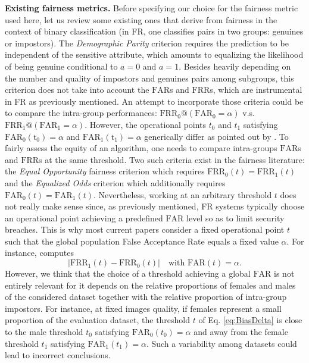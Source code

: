 \documentclass[nohyperref]{article}
\theoremstyle{plain}
\theoremstyle{definition}
\theoremstyle{remark}
\begin{document}
{\bf Existing fairness metrics.} Before specifying our choice for the fairness metric used here, let us review some existing ones \cite{survey_fairness_ML} that derive from fairness in the context of binary classification (in FR, one classifies pairs in two groups: genuines or impostors). 
The {\it Demographic Parity} criterion requires the prediction to be independent of the sensitive attribute, which amounts to equalizing the likelihood of being genuine conditional to $a=0$ and $a=1$. Besides heavily depending on the number and quality of impostors and genuines pairs among subgroups, this criterion does not take into account the $\mathrm{FAR}$s and $\mathrm{FRR}$s, which are instrumental in FR as previously mentioned. An attempt to incorporate those criteria could be to compare the intra-group performances: $\mathrm{FRR}_0 @ (\mathrm{FAR}_0 = \alpha)$ v.s. $\mathrm{FRR}_1 @ (\mathrm{FAR}_1 = \alpha)$. However, the operational points $t_0$ and $t_1$ satisfying $\mathrm{FAR_0(t_0)} = \alpha$ and $\mathrm{FAR_1(t_1)} = \alpha$ generically differ as pointed out by \cite{issues_race_bias}. To fairly assess the equity of an algorithm, one needs to compare intra-groups $\mathrm{FAR}$s and $\mathrm{FRR}$s at the same threshold. Two such criteria exist in the fairness literature: the {\it Equal Opportunity} fairness criterion which requires $\mathrm{FRR}_0(t) = \mathrm{FRR}_1(t)$ and the {\it Equalized Odds} criterion which additionally requires $\mathrm{FAR}_0(t) = \mathrm{FAR}_1(t)$. Nevertheless, working at an arbitrary threshold $t$ does not really make sense since, as previously mentioned, FR systems typically choose an operational point achieving a predefined $\mathrm{FAR}$ level so as to limit security breaches. This is why most current papers consider a fixed operational point $t$ such that the global population False Acceptance Rate equals a fixed value $\alpha$. For instance, \cite{dhar2021pass} computes
\begin{equation} 
| \mathrm{FRR}_1(t) - \mathrm{FRR}_0(t) | \quad \text{with} \, \, \mathrm{FAR}(t) = \alpha. 
\label{eq:BiasDelta}
\end{equation}
However, we think that the choice of a threshold achieving a global $\mathrm{FAR}$ is not entirely relevant for it depends on the relative proportions of females and males of the considered dataset together with the relative proportion of intra-group impostors. For instance, at fixed images quality, if females represent a small proportion of the evaluation dataset, the threshold $t$ of Eq. \ref{eq:BiasDelta} is close to the male threshold $t_0$ satisfying $\mathrm{FAR}_0(t_0) = \alpha$ and away from the female threshold $t_1$ satisfying $\mathrm{FAR}_1(t_1)=\alpha$. Such a variability among datasets could lead to incorrect conclusions.
\end{document}
